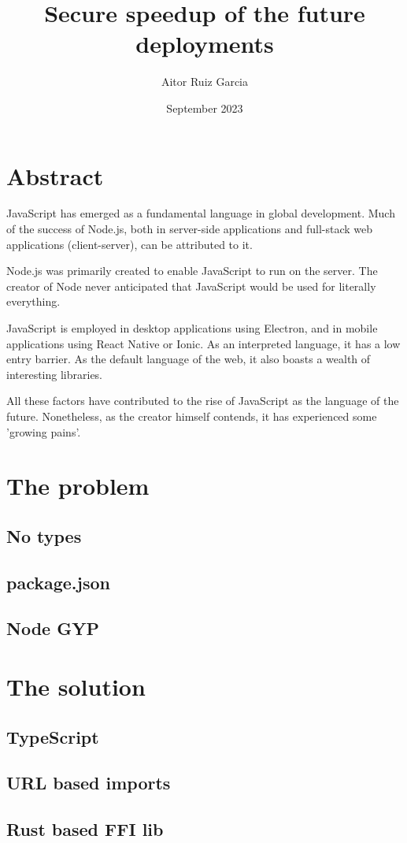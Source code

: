 \documentclass[12pt, letterpaper]{article}
\title{Secure speedup of the future deployments}
\author{Aitor Ruiz Garcia}
\date{September 2023}
\begin{document}
\maketitle
\begin{multicols}{2}
    \section{Abstract}
    JavaScript has emerged as a fundamental language in global development. Much of the success of Node.js, both in server-side applications and full-stack web applications (client-server), can be attributed to it.

    Node.js was primarily created to enable JavaScript to run on the server. The creator of Node never anticipated that JavaScript would be used for literally everything.

    JavaScript is employed in desktop applications using Electron, and in mobile applications using React Native or Ionic. As an interpreted language, it has a low entry barrier. As the default language of the web, it also boasts a wealth of interesting libraries.

    All these factors have contributed to the rise of JavaScript as the language of the future. Nonetheless, as the creator himself contends, it has experienced some 'growing pains'.
    \section{The problem}
    \subsection{No types}
    \subsection{package.json}
    \subsection{Node GYP}
    \section{The solution}
    \subsection{TypeScript}
    \subsection{URL based imports}
    \subsection{Rust based FFI lib}

\end{multicols}
\end{document}

